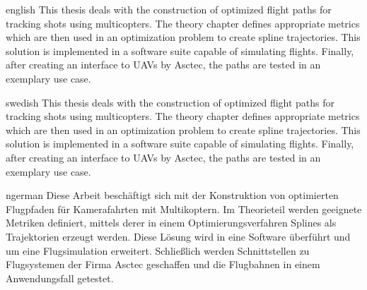 \begin{myAbstract}{english}
This thesis deals with the construction of optimized flight paths for tracking shots using multicopters.
The theory chapter defines appropriate metrics which are then used in an optimization problem to create spline trajectories.
This solution is implemented in a software suite capable of simulating flights.
Finally, after creating an interface to UAVs by Asctec, the paths are tested in an exemplary use case.
\end{myAbstract}

\begin{myAbstract}{swedish}
This thesis deals with the construction of optimized flight paths for tracking shots using multicopters.
The theory chapter defines appropriate metrics which are then used in an optimization problem to create spline trajectories.
This solution is implemented in a software suite capable of simulating flights.
Finally, after creating an interface to UAVs by Asctec, the paths are tested in an exemplary use case.
\end{myAbstract}

\begin{myAbstract}{ngerman}
Diese Arbeit beschäftigt sich mit der Konstruktion von optimierten Flugpfaden für Kamerafahrten mit Multikoptern.
Im Theorieteil werden geeignete Metriken definiert, mittels derer in einem Optimierungsverfahren Splines als Trajektorien erzeugt werden.
Diese Lösung wird in eine Software überführt und um eine Flugsimulation erweitert.
Schließlich werden Schnittstellen zu Flugsystemen der Firma Asctec geschaffen und die Flugbahnen in einem Anwendungsfall getestet.
\end{myAbstract}
